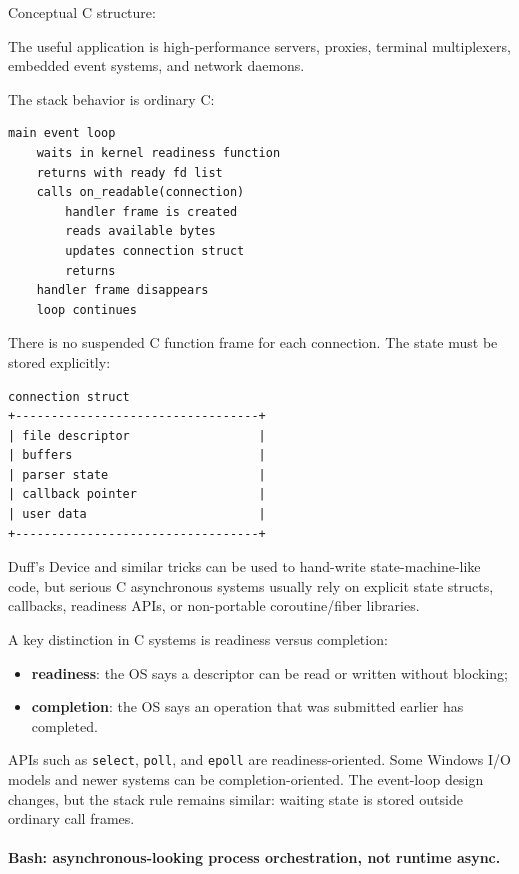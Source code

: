 Conceptual C structure:

The useful application is high-performance servers, proxies, terminal multiplexers, embedded event systems, and network daemons.

The stack behavior is ordinary C:

\begin{verbatim}
main event loop
    waits in kernel readiness function
    returns with ready fd list
    calls on_readable(connection)
        handler frame is created
        reads available bytes
        updates connection struct
        returns
    handler frame disappears
    loop continues
\end{verbatim}

There is no suspended C function frame for each connection. The state must be stored explicitly:

\begin{verbatim}
connection struct
+----------------------------------+
| file descriptor                  |
| buffers                          |
| parser state                     |
| callback pointer                 |
| user data                        |
+----------------------------------+
\end{verbatim}

Duff's Device and similar tricks can be used to hand-write state-machine-like code, but serious C asynchronous systems usually rely on explicit state structs, callbacks, readiness APIs, or non-portable coroutine/fiber libraries.

A key distinction in C systems is readiness versus completion:

\begin{itemize}
    \item \textbf{readiness}: the OS says a descriptor can be read or written without blocking;
    \item \textbf{completion}: the OS says an operation that was submitted earlier has completed.
\end{itemize}

APIs such as \texttt{select}, \texttt{poll}, and \texttt{epoll} are readiness-oriented. Some Windows I/O models and newer systems can be completion-oriented. The event-loop design changes, but the stack rule remains similar: waiting state is stored outside ordinary call frames.

\paragraph{Bash: asynchronous-looking process orchestration, not runtime async.}

